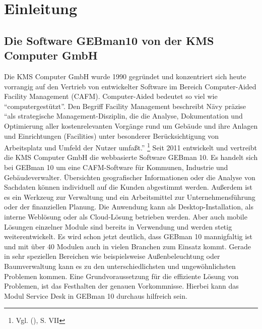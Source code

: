 \section{Einleitung}

\subsection{Die Software GEBman10 von der KMS Computer GmbH}
\noindent
Die KMS Computer GmbH wurde 1990 gegründet und konzentriert sich heute vorrangig auf den Vertrieb von entwickelter Software im Bereich Computer-Aided Facility Management (CAFM).
Computer-Aided bedeutet so viel wie \enquote{computergestützt}. Den Begriff Facility Management beschreibt Nävy präzise 
\enquote{als strategische Management-Disziplin, die die Analyse, Dokumentation und Optimierung aller kostenrelevanten Vorgänge rund um Gebäude und ihre Anlagen und Einrichtungen (Facilities) unter besonderer Berücksichtigung von Arbeitsplatz und Umfeld der Nutzer umfaßt.} \footnote{Vgl. \citeauthor{Naevy} (\citeyear{Naevy}), S. VII}
\noindent
Seit 2011 entwickelt und vertreibt die KMS Computer GmbH die webbasierte Software GEBman 10. Es handelt sich bei GEBman 10 um eine CAFM-Software für Kommunen, Industrie und Gebäudeverwalter. Übersichten geografischer Informationen oder die Analyse von Sachdaten können individuell auf die Kunden abgestimmt werden. Außerdem ist es ein Werkzeug zur Verwaltung und ein Arbeitsmittel zur Unternehmensführung oder der finanziellen Planung. Die Anwendung kann als Desktop-Installation, als interne Weblösung oder als Cloud-Lösung betrieben werden. Aber auch mobile Lösungen einzelner Module sind bereits in Verwendung und werden stetig weiterentwickelt. Es wird schon jetzt deutlich, dass GEBman 10 mannigfaltig ist und mit über 40 Modulen auch in vielen Branchen zum Einsatz kommt.
Gerade in sehr speziellen Bereichen wie beispielsweise Außenbeleuchtung oder Baumverwaltung kann es zu den unterschiedlichsten und ungewöhnlichsten Problemen kommen. Eine Grundvoraussetzung  für die effiziente Lösung von Problemen, ist das Festhalten der genauen Vorkommnisse. Hierbei kann das Modul Service Desk in GEBman 10 durchaus hilfreich sein.




